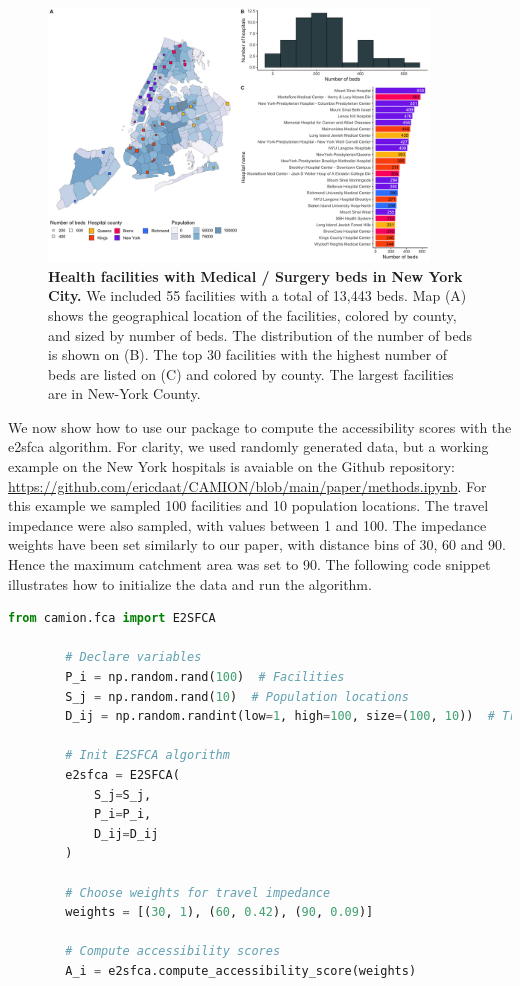 \begin{figure}[h]
    \includegraphics[width=0.9\textwidth]{images/camion-ny/fig1.png}
    \centering
    \caption{ \textbf{Health facilities with Medical / Surgery beds in New York
            City.} We included 55 facilities with a total of 13,443 beds. Map (A)
        shows the geographical location of the facilities, colored by county,
        and sized by number of beds. The distribution of the number of beds is
        shown on (B). The top 30 facilities with the highest number of beds are
        listed on (C) and colored by county. The largest facilities are in
        New-York County. }
    \label{fig:camion-ny-beds}
\end{figure}

We now show how to use our package to compute the accessibility scores with
the \ac{e2sfca} algorithm. For clarity, we used randomly generated data,
but a working example on the New York hospitals is avaiable on the Github
repository: \url{https://github.com/ericdaat/CAMION/blob/main/paper/methods.ipynb}.
For this example we sampled 100 facilities and 10 population locations. The
travel impedance were also sampled, with values between 1 and 100. The impedance
weights have been set similarly to our paper, with distance bins of 30, 60 and
90. Hence the maximum catchment area was set to 90. The following code snippet
illustrates how to initialize the data and run the algorithm.

\begin{minipage}{\textwidth}
    \begin{lstlisting}[language=Python, caption=Compute accessibility score with \ac{e2sfca}]
        from camion.fca import E2SFCA

        # Declare variables
        P_i = np.random.rand(100)  # Facilities
        S_j = np.random.rand(10)  # Population locations
        D_ij = np.random.randint(low=1, high=100, size=(100, 10))  # Travel impedance

        # Init E2SFCA algorithm
        e2sfca = E2SFCA(
            S_j=S_j,
            P_i=P_i,
            D_ij=D_ij
        )

        # Choose weights for travel impedance
        weights = [(30, 1), (60, 0.42), (90, 0.09)]

        # Compute accessibility scores
        A_i = e2sfca.compute_accessibility_score(weights)
    \end{lstlisting}
\end{minipage}


